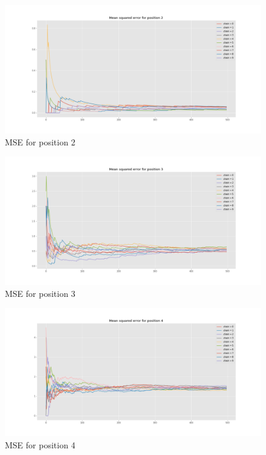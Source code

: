 \documentclass[]{article}
\begin{document}
	\begin{figure}[H]
		\begin{center}
			
			\includegraphics[width=1\textwidth]{task4/figures/T_2_4/Q2/mse_pos2.png}
			\caption*{MSE for position 2}
		\end{center}
	\end{figure}
	
	\begin{figure}[H]
		\begin{center}
			
			\includegraphics[width=1\textwidth]{task4/figures/T_2_4/Q2/mse_pos3.png}
			\caption*{MSE for position 3}
		\end{center}
	\end{figure}
	
	\begin{figure}[H]
		\begin{center}
			
			\includegraphics[width=1\textwidth]{task4/figures/T_2_4/Q2/mse_pos4.png}
			\caption*{MSE for position 4}
		\end{center}
	\end{figure}
	
\end{document}
